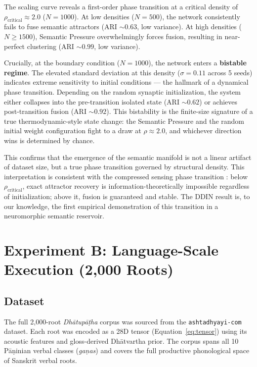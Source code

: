 \documentclass{article}
\begin{document}
The scaling curve reveals a first-order phase transition at a critical density of
$\rho_{\text{critical}} \approx 2.0$ ($N = 1000$). At low densities ($N = 500$),
the network consistently fails to fuse semantic attractors (ARI $\sim 0.63$, low
variance). At high densities ($N \geq 1500$), Semantic Pressure overwhelmingly forces
fusion, resulting in near-perfect clustering (ARI $\sim 0.99$, low variance).

Crucially, at the boundary condition ($N = 1000$), the network enters a
\textbf{bistable regime}. The elevated standard deviation at this density
($\sigma = 0.11$ across 5 seeds) indicates extreme sensitivity to initial conditions —
the hallmark of a dynamical phase transition. Depending on the random synaptic
initialization, the system either collapses into the pre-transition isolated state
(ARI $\sim 0.62$) or achieves post-transition fusion (ARI $\sim 0.92$). This
bistability is the finite-size signature of a true thermodynamic-style state change:
the Semantic Pressure and the random initial weight configuration fight to a draw at
$\rho \approx 2.0$, and whichever direction wins is determined by chance.

This confirms that the emergence of the semantic manifold is not a linear artifact of
dataset size, but a true phase transition governed by structural density. This
interpretation is consistent with the compressed sensing phase transition
\citep{donoho2006compressed}: below $\rho_{\text{critical}}$, exact attractor recovery
is information-theoretically impossible regardless of initialization; above it, fusion
is guaranteed and stable. The DDIN result is, to our knowledge, the first empirical
demonstration of this transition in a neuromorphic semantic reservoir.

\section{Experiment B: Language-Scale Execution (2,000 Roots)}

\subsection{Dataset}

The full 2,000-root \textit{Dhātupāṭha} corpus was sourced from the
\texttt{ashtadhyayi-com} dataset. Each root was encoded as a 28D tensor
(Equation~\ref{eq:tensor}) using its acoustic features and gloss-derived Dhātvartha
prior. The corpus spans all 10 Pāṇinian verbal classes (\textit{gaṇas}) and covers the
full productive phonological space of Sanskrit verbal roots.
\end{document}
